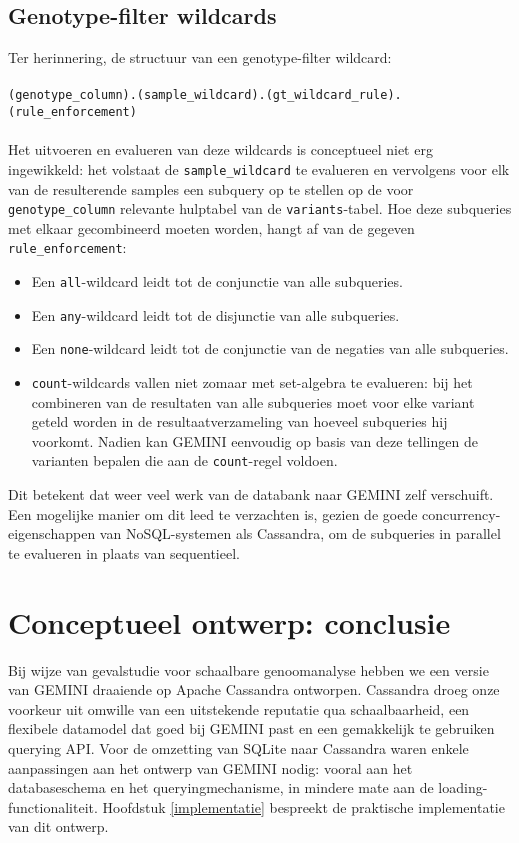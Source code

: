 \subsection{Genotype-filter wildcards}

Ter herinnering, de structuur van een genotype-filter wildcard:\\\\
\texttt{(genotype\_column).(sample\_wildcard).(gt\_wildcard\_rule).(rule\_enforcement)}\\\\
Het uitvoeren en evalueren van deze wildcards is conceptueel niet erg ingewikkeld: het volstaat de \texttt{sample\_wildcard} te evalueren en vervolgens voor elk van de resulterende samples een subquery op te stellen op de voor \texttt{genotype\_column} relevante hulptabel van de \texttt{variants}-tabel. Hoe deze subqueries met elkaar gecombineerd moeten worden, hangt af van de gegeven \texttt{rule\_enforcement}:

\begin{itemize}
\item Een \texttt{all}-wildcard leidt tot de conjunctie van alle subqueries.
\item Een \texttt{any}-wildcard leidt tot de disjunctie van alle subqueries.
\item Een \texttt{none}-wildcard leidt tot de conjunctie van de negaties van alle subqueries.
\item \texttt{count}-wildcards vallen niet zomaar met set-algebra te evalueren: bij het combineren van de resultaten van alle subqueries moet voor elke variant geteld worden in de resultaatverzameling van hoeveel subqueries hij voorkomt. Nadien kan GEMINI eenvoudig op basis van deze tellingen de varianten bepalen die aan de \texttt{count}-regel voldoen.
\end{itemize}

Dit betekent dat weer veel werk van de databank naar GEMINI zelf verschuift. Een mogelijke manier om dit leed te verzachten is, gezien de goede concurrency-eigenschappen van NoSQL-systemen als Cassandra, om de subqueries in parallel te evalueren in plaats van sequentieel.

\section{Conceptueel ontwerp: conclusie}

Bij wijze van gevalstudie voor schaalbare genoomanalyse hebben we een versie van GEMINI draaiende op Apache Cassandra ontworpen. Cassandra droeg onze voorkeur uit omwille van een uitstekende reputatie qua schaalbaarheid, een flexibele datamodel dat goed bij GEMINI past en een gemakkelijk te gebruiken querying API. Voor de omzetting van SQLite naar Cassandra waren enkele aanpassingen aan het ontwerp van GEMINI nodig: vooral aan het databaseschema en het queryingmechanisme, in mindere mate aan de loading-functionaliteit. Hoofdstuk \ref{implementatie} bespreekt de praktische implementatie van dit ontwerp.